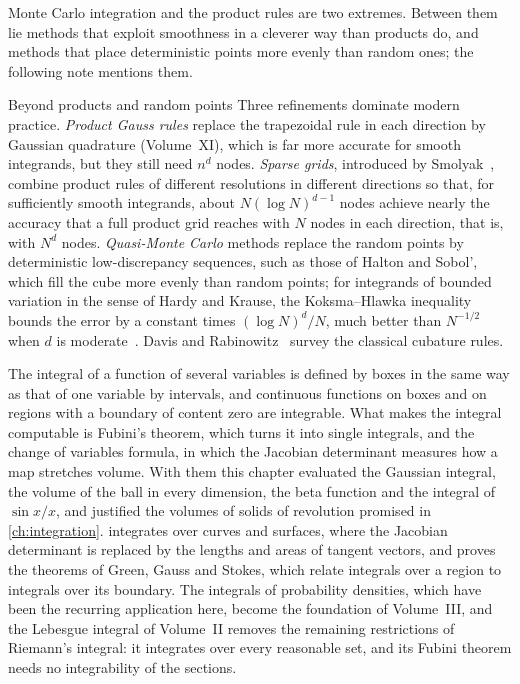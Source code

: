 Monte Carlo integration and the product rules are two extremes. Between them lie methods that exploit smoothness in a cleverer way than products do, and methods that place deterministic points more evenly than random ones; the following note mentions them.

\begin{note}{Beyond products and random points}
Three refinements dominate modern practice. \emph{Product Gauss rules} replace the trapezoidal rule in each direction by Gaussian quadrature (Volume~XI), which is far more accurate for smooth integrands, but they still need $n^d$ nodes. \emph{Sparse grids}, introduced by Smolyak~\cite{smolyak1963}, combine product rules of different resolutions in different directions so that, for sufficiently smooth integrands, about $N(\log N)^{d-1}$ nodes achieve nearly the accuracy that a full product grid reaches with $N$ nodes in each direction, that is, with $N^d$ nodes. \emph{Quasi-Monte Carlo} methods replace the random points by deterministic low-discrepancy sequences, such as those of Halton and Sobol', which fill the cube more evenly than random points; for integrands of bounded variation in the sense of Hardy and Krause, the Koksma--Hlawka inequality bounds the error by a constant times $(\log N)^d/N$, much better than $N^{-1/2}$ when $d$ is moderate~\cite{niederreiter1992}. Davis and Rabinowitz~\cite{davis1984} survey the classical cubature rules.
\end{note}

\bigskip
The integral of a function of several variables is defined by boxes in the same way as that of one variable by intervals, and continuous functions on boxes and on regions with a boundary of content zero are integrable. What makes the integral computable is Fubini's theorem, which turns it into single integrals, and the change of variables formula, in which the Jacobian determinant measures how a map stretches volume. With them this chapter evaluated the Gaussian integral, the volume of the ball in every dimension, the beta function and the integral of $\sin x/x$, and justified the volumes of solids of revolution promised in \cref{ch:integration}.  integrates over curves and surfaces, where the Jacobian determinant is replaced by the lengths and areas of tangent vectors, and proves the theorems of Green, Gauss and Stokes, which relate integrals over a region to integrals over its boundary. The integrals of probability densities, which have been the recurring application here, become the foundation of Volume~III, and the Lebesgue integral of Volume~II removes the remaining restrictions of Riemann's integral: it integrates over every reasonable set, and its Fubini theorem needs no integrability of the sections.

